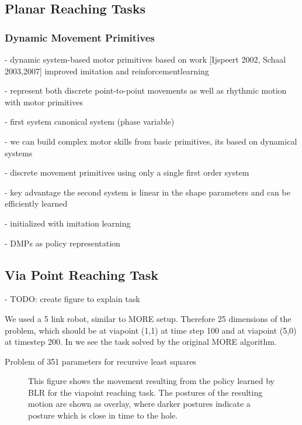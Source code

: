 \subsection{Planar Reaching Tasks}

\subsubsection{Dynamic Movement Primitives}
- dynamic system-based motor primitives based on work [Ijspeert 2002, Schaal 2003,2007]
improved imitation and reinforcementlearning

- represent both discrete point-to-point movements as well as rhythmic motion
with motor primitives

- first system canonical system (phase variable)

- we can build complex motor skills from basic primitives,
  its based on dynamical systems

- discrete movement primitives using only a single first order system

- key advantage the second system is linear in the shape parameters and can
  be efficiently learned

- initialized with imitation learning

- DMPs as policy representation

\subsection{Via Point Reaching Task}
- TODO: create figure to explain task

We used a 5 link robot, similar to MORE setup.
Therefore 25 dimensions of the problem, which should be at viapoint (1,1)
at time step 100 and at viapoint (5,0) at timestep 200.
In  we see the task solved by the original MORE algorithm.

Problem of 351 parameters for recursive least squares

\begin{figure}[ht!]
  \centering
     
     \hspace{1cm}                       
     \caption{This figure shows the movement resulting from the policy
       learned by BLR for the viapoint reaching task.
       The postures of the resulting motion are shown as overlay,
       where darker postures indicate a posture which
       is close in time to the hole.}
     \label{fig:blr_via}  
\end{figure}

